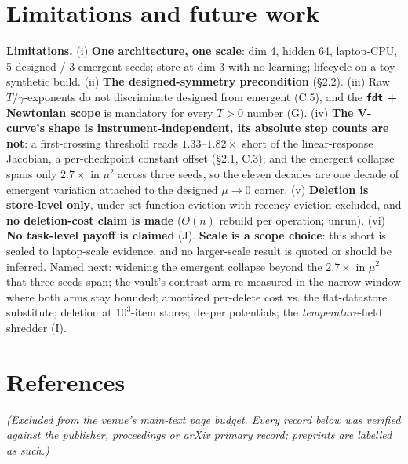 \documentclass{article}
\begin{document}
\section{Limitations and future work}

\textbf{Limitations.} (i) \textbf{One architecture, one scale}: dim 4, hidden 64, laptop-CPU, 5 designed / 3 emergent seeds; store at dim 3 with no learning; lifecycle on a toy synthetic build. (ii) \textbf{The designed-symmetry precondition} (\S 2.2). (iii) Raw $T/\gamma$-exponents do not discriminate designed from emergent (C.5), and the \textbf{\texttt{fdt} + Newtonian scope} is mandatory for every $T>0$ number (G). (iv) \textbf{The V-curve's shape is instrument-independent, its absolute step counts are not}: a first-crossing threshold reads $1.33$--$1.82\times$ short of the linear-response Jacobian, a per-checkpoint constant offset (\S 2.1, C.3); and the emergent collapse spans only $2.7\times$ in $\mu^2$ across three seeds, so the eleven decades are one decade of emergent variation attached to the designed $\mu\to0$ corner. (v) \textbf{Deletion is store-level only}, under set-function eviction with recency eviction excluded, and \textbf{no deletion-cost claim is made} ($O(n)$ rebuild per operation; unrun). (vi) \textbf{No task-level payoff is claimed} (J). \textbf{Scale is a scope choice}: this short is sealed to laptop-scale evidence, and no larger-scale result is quoted or should be inferred. Named next: widening the emergent collapse beyond the $2.7\times$ in $\mu^2$ that three seeds span; the vault's contrast arm re-measured in the narrow window where both arms stay bounded; amortized per-delete cost vs. the flat-datastore substitute; deletion at $10^3$-item stores; deeper potentials; the \emph{temperature}-field shredder (I).

\section*{References}

\emph{(Excluded from the venue's main-text page budget. Every record below was verified against the publisher, proceedings or arXiv primary record; preprints are labelled as such.)}
\end{document}

